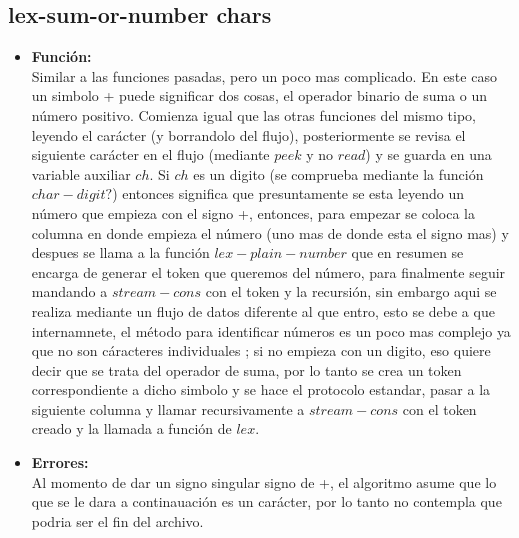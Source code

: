 \documentclass{article}
\begin{document}
\subsection{lex-sum-or-number chars}
\begin{itemize}
    \item \textbf{Función:} \\
    Similar a las funciones pasadas, pero un poco mas complicado. En este caso un simbolo + puede significar dos cosas, el operador binario de suma o un número positivo. Comienza igual que las otras funciones del mismo tipo, leyendo el carácter (y borrandolo del flujo), posteriormente se revisa el siguiente carácter en el flujo (mediante $peek$ y no $read$) y se guarda en una variable auxiliar $ch$.
    Si $ch$ es un digito (se comprueba mediante la función $char-digit?$) entonces significa que presuntamente se esta leyendo un número que empieza con el signo +, entonces, para empezar se coloca la columna en donde empieza el número (uno mas de donde esta el signo mas) y despues se llama a la función $lex-plain-number$ que en resumen se encarga de generar el token que queremos del número, para finalmente seguir mandando a $stream-cons$ con el token y la recursión, sin embargo aqui se realiza mediante un flujo de datos diferente al que entro, esto se debe a que internamnete, el método para identificar números es un poco mas complejo ya que no son cáracteres individuales ; si no empieza con un digito, eso quiere decir que se trata del operador de suma, por lo tanto se crea un token correspondiente a dicho simbolo y se hace el protocolo estandar, pasar a la siguiente columna y llamar recursivamente a $stream-cons$ con el token creado y la llamada a función de $lex$.
    \item \textbf{Errores:} \\ 
    Al momento de dar un signo singular signo de +, el algoritmo asume que lo que se le dara a continauación es un carácter, por lo tanto no contempla que podria ser el fin del archivo.
\end{itemize}
\end{document}
